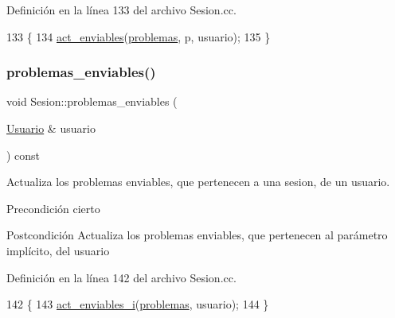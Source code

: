 Definición en la línea 133 del archivo Sesion.\+cc.


\begin{DoxyCode}
133                                                                                   \{
134         \mbox{\hyperlink{class_sesion_a7e64b66ecf1ad363dd0c394ec59eaa91}{act\_enviables}}(\mbox{\hyperlink{class_sesion_a7125fb9a733e06305e8e8889926b8d1b}{problemas}}, p, usuario);
135       \}
\end{DoxyCode}
\mbox{\label{class_sesion_a277a3775d1e19373e3ca507b819b5cc8}} 
\subsubsection{\texorpdfstring{problemas\+\_\+enviables()}{problemas\_enviables()}}
{\footnotesize\ttfamily void Sesion\+::problemas\+\_\+enviables (\begin{DoxyParamCaption}\item[{\mbox{\hyperlink{class_usuario}{Usuario}} \&}]{usuario }\end{DoxyParamCaption}) const}



Actualiza los problemas enviables, que pertenecen a una sesion, de un usuario. 

\begin{DoxyPrecond}{Precondición}
cierto 
\end{DoxyPrecond}
\begin{DoxyPostcond}{Postcondición}
Actualiza los problemas enviables, que pertenecen al parámetro implícito, del usuario 
\end{DoxyPostcond}


Definición en la línea 142 del archivo Sesion.\+cc.


\begin{DoxyCode}
142                                                              \{
143         \mbox{\hyperlink{class_sesion_ad391d505577569f30635f19a0f36c9a0}{act\_enviables\_i}}(\mbox{\hyperlink{class_sesion_a7125fb9a733e06305e8e8889926b8d1b}{problemas}}, usuario);
144       \}
\end{DoxyCode}
\mbox{\label{class_sesion_ac5cabac266d233381c6c94391fe85769}} 
